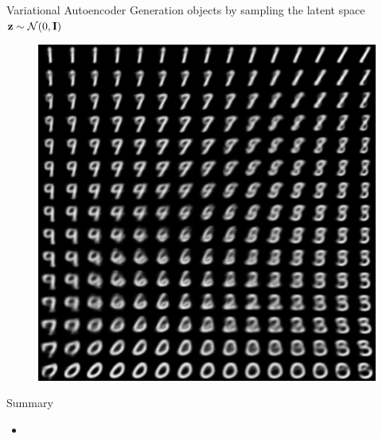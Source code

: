 \begin{frame}{Variational Autoencoder}
Generation objects by sampling the latent space $\mathbf{z} \sim \mathcal{N}(0, \mathbf{I})$
\begin{figure}[h]
	\centering
	\includegraphics[width=.5\linewidth]{figs/vae_0.png}
\end{figure}
\end{frame}
\begin{frame}{Summary}
	\begin{itemize}
		\item 
	\end{itemize}
\end{frame}
 